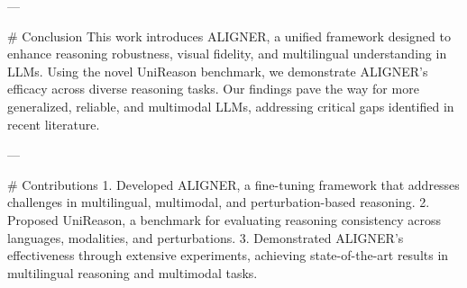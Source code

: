 ---

# Conclusion
This work introduces ALIGNER, a unified framework designed to enhance reasoning robustness, visual fidelity, and multilingual understanding in LLMs. Using the novel UniReason benchmark, we demonstrate ALIGNER’s efficacy across diverse reasoning tasks. Our findings pave the way for more generalized, reliable, and multimodal LLMs, addressing critical gaps identified in recent literature.

---

# Contributions
1. Developed ALIGNER, a fine-tuning framework that addresses challenges in multilingual, multimodal, and perturbation-based reasoning.
2. Proposed UniReason, a benchmark for evaluating reasoning consistency across languages, modalities, and perturbations.
3. Demonstrated ALIGNER's effectiveness through extensive experiments, achieving state-of-the-art results in multilingual reasoning and multimodal tasks.